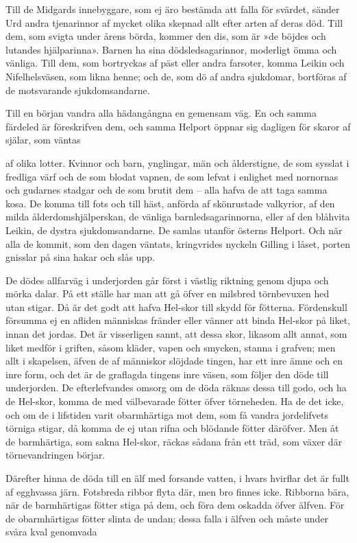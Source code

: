 Till de Midgards innebyggare, som ej äro bestämda att falla för svärdet,
sänder Urd andra tjenarinnor af mycket olika skepnad allt efter arten af
deras död. Till dem, som svigta under årens börda, kommer den dis, som
är »de böjdes och lutandes hjälparinna». Barnen ha sina
dödsledsagarinnor, moderligt ömma och vänliga. Till dem, som bortryckas
af päst eller andra farsoter, komma Leikin och Nifelhelsväsen, som likna
henne; och de, som dö af andra sjukdomar, bortföras af de motsvarande
sjukdomsandarne.

Till en början vandra alla hädangångna en gemensam väg. En och samma
färdeled är föreskrifven dem, och samma Helport öppnar sig dagligen för
skaror af själar, som väntas

af olika lotter. Kvinnor och barn, ynglingar, män och ålderstigne, de
som sysslat i fredliga värf och de som blodat vapnen, de som lefvat i
enlighet med nornornas och gudarnes stadgar och de som brutit dem --
alla hafva de att taga samma kosa. De komma till fots och till häst,
anförda af skönrustade valkyrior, af den milda ålderdomshjälperskan, de
vänliga barnledsagarinnorna, eller af den blåhvita Leikin, de dystra
sjukdomsandarne. De samlas utanför österns Helport. Och när alla de
kommit, som den dagen väntats, kringvrides nyckeln Gilling i låset,
porten gnisslar på sina hakar och slås upp.

De dödes allfarväg i underjorden går först i västlig riktning genom
djupa och mörka dalar. På ett ställe har man att gå öfver en milsbred
törnbevuxen hed utan stigar. Då är det godt att hafva Hel-skor till
skydd för fötterna. Fördenskull försumma ej en afliden människas fränder
eller vänner att binda Hel-skor på liket, innan det jordas. Det är
visserligen sannt, att dessa skor, likasom allt annat, som liket medför
i griften, såsom kläder, vapen och smycken, stanna i grafven; men allt i
skapelsen, äfven de af människor slöjdade tingen, har ett inre ämne och
en inre form, och det är de graflagda tingens inre väsen, som följer den
döde till underjorden. De efterlefvandes omsorg om de döda räknas dessa
till godo, och ha de Hel-skor, komma de med välbevarade fötter öfver
törneheden. Ha de det icke, och om de i lifstiden varit obarmhärtiga mot
dem, som få vandra jordelifvets törniga stigar, då komma de ej utan
rifna och blödande fötter däröfver. Men åt de barmhärtiga, som sakna
Hel-skor, räckas sådana från ett träd, som växer där törnevandringen
börjar.

Därefter hinna de döda till en älf med forsande vatten, i hvars hvirflar
det är fullt af egghvassa järn. Fotsbreda ribbor flyta där, men bro
finnes icke. Ribborna bära, när de barmhärtigas fötter stiga på dem, och
föra dem oskadda öfver älfven. För de obarmhärtigas fötter slinta de
undan; dessa falla i älfven och måste under svåra kval genomvada

